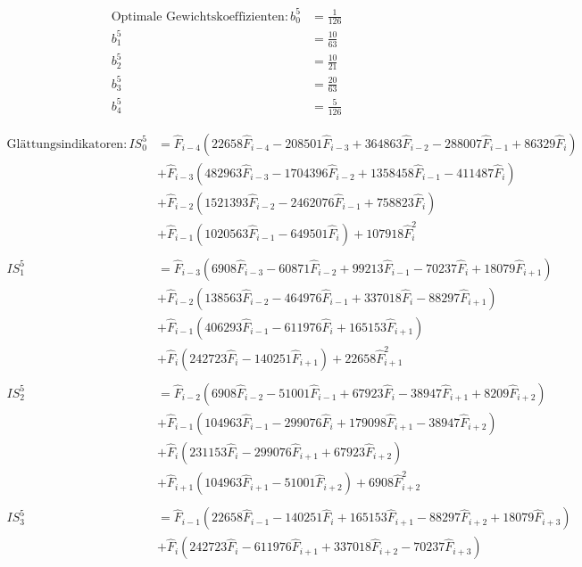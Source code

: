 \begin{align*}
\text{Optimale Gewichtskoeffizienten}:
b_0^5 &= \frac{1}{126}
\\
b_1^5 &= \frac{10}{63}
\\
b_2^5 &= \frac{10}{21}
\\
b_3^5 &= \frac{20}{63}
\\
b_4^5 &= \frac{5}{126}
\end{align*}

\begin{align*}
\text{Glättungsindikatoren}:
IS^5_0 &= \hat{F}_{i-4} (22658 \hat{F}_{i-4} - 208501 \hat{F}_{i-3} + 364863 \hat{F}_{i-2} - 288007 \hat{F}_{i-1} + 86329 \hat{F}_{i})\\
&+ \hat{F}_{i-3} (482963 \hat{F}_{i-3} - 1704396 \hat{F}_{i-2} + 1358458 \hat{F}_{i-1} - 411487 \hat{F}_{i})\\
&+ \hat{F}_{i-2} (1521393 \hat{F}_{i-2} - 2462076 \hat{F}_{i-1} + 758823 \hat{F}_{i})\\
&+ \hat{F}_{i-1} (1020563 \hat{F}_{i-1} - 649501 \hat{F}_{i}) + 107918 \hat{F}_{i}^2\\
\\
IS^5_1 &= \hat{F}_{i-3} (6908 \hat{F}_{i-3} - 60871 \hat{F}_{i-2} + 99213 \hat{F}_{i-1} - 70237 \hat{F}_{i} + 18079 \hat{F}_{i+1})\\
&+ \hat{F}_{i-2} (138563 \hat{F}_{i-2} - 464976 \hat{F}_{i-1} + 337018 \hat{F}_{i} - 88297 \hat{F}_{i+1})\\
&+ \hat{F}_{i-1} (406293 \hat{F}_{i-1} - 611976 \hat{F}_{i} + 165153 \hat{F}_{i+1})\\
&+ \hat{F}_{i} (242723 \hat{F}_{i} - 140251 \hat{F}_{i+1}) + 22658 \hat{F}_{i+1}^2\\
\\
IS^5_2 &= \hat{F}_{i-2} (6908 \hat{F}_{i-2} - 51001 \hat{F}_{i-1} + 67923 \hat{F}_{i} - 38947 \hat{F}_{i+1} + 8209 \hat{F}_{i+2})\\
&+ \hat{F}_{i-1} (104963 \hat{F}_{i-1} - 299076 \hat{F}_{i} + 179098 \hat{F}_{i+1} - 38947 \hat{F}_{i+2})\\
&+ \hat{F}_{i} (231153 \hat{F}_{i} - 299076 \hat{F}_{i+1} + 67923 \hat{F}_{i+2})\\
&+ \hat{F}_{i+1} (104963 \hat{F}_{i+1} - 51001 \hat{F}_{i+2}) + 6908 \hat{F}_{i+2}^2\\
\\
IS^5_3 &= \hat{F}_{i-1} (22658 \hat{F}_{i-1} - 140251 \hat{F}_{i} + 165153 \hat{F}_{i+1} - 88297 \hat{F}_{i+2} + 18079 \hat{F}_{i+3})\\
&+ \hat{F}_{i} (242723 \hat{F}_{i} - 611976 \hat{F}_{i+1} + 337018 \hat{F}_{i+2} - 70237 \hat{F}_{i+3})\\

\end{align*}
